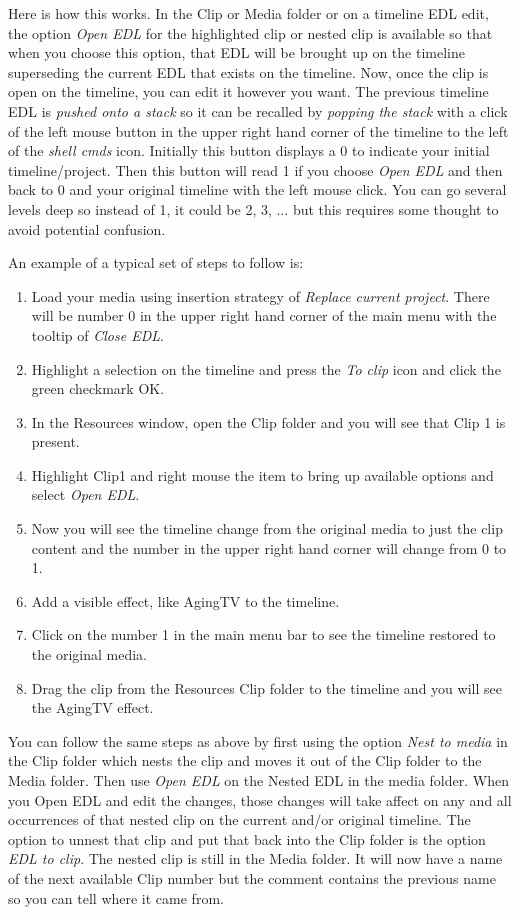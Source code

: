 Here is how this works. In the Clip or Media folder or on a timeline
EDL edit, the option \textit{Open EDL} for the highlighted clip or
nested clip is available so that when you choose this option, that
EDL will be brought up on the timeline superseding the current EDL
that exists on the timeline.  Now, once the clip is open on the
timeline, you can edit it however you want. The previous timeline
EDL is \textit{pushed onto a stack} so it can be recalled by
\textit{popping the stack} with a click of the left mouse button in
the upper right hand corner of the timeline to the left of the
\textit{shell cmds} icon.  Initially this button displays a 0 to
indicate your initial timeline/project.  Then this button will read
1 if you choose \textit{Open EDL} and then back to 0 and your
original timeline with the left mouse click.  You can go several
levels deep so instead of 1, it could be 2, 3, $\dots$ but this
requires some thought to avoid potential confusion.

An example of a typical set of steps to follow is:
\begin{enumerate}
	\item Load your media using insertion strategy of \textit{Replace
		current project}.  There will be number 0 in the upper right hand corner
	of the main menu with the tooltip of \textit{Close EDL}.
	\item Highlight a selection on the timeline and press the
	\textit{To clip} icon and click the green checkmark OK.
	\item In the Resources window, open the Clip folder and you will
	see that Clip 1 is present.
	\item Highlight Clip1 and right mouse the item to bring up
	available options and select \textit{Open EDL}.
	\item Now you will see the timeline change from the original
	media to just the clip content and the number in the upper right hand
	corner will change from 0 to 1.
	\item Add a visible effect, like AgingTV to the timeline.
	\item Click on the number 1 in the main menu bar to see the timeline
	restored to the original media.
	\item Drag the clip from the Resources Clip folder to the
	timeline and you will see the AgingTV effect.
\end{enumerate}

You can follow the same steps as above by first using the option
\textit{Nest to media} in the Clip folder which nests the clip and
moves it out of the Clip folder to the Media folder.  Then use
\textit{Open EDL} on the Nested EDL in the media folder.  When you
Open EDL and edit the changes, those changes will take affect on any
and all occurrences of that nested clip on the current and/or
original timeline. The option to unnest that clip and put that back
into the Clip folder is the option \textit{EDL to clip}.  The nested
clip is still in the Media folder.  It will now have a name of the
next available Clip number but the comment contains the previous name so
you can tell where it came from.

